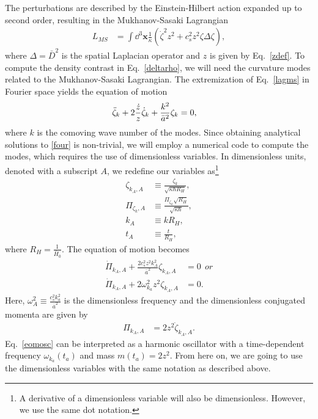 \documentclass[a4paper,11pt]{article}
\begin{document}
The perturbations are described by the Einstein-Hilbert action expanded up to second order, resulting in the Mukhanov-Sasaki Lagrangian
\begin{align}
	\label{lagms}
	L_{MS} & = \int \dd^3\textbf{x} \frac{1}{ \kappa} \left({\dot{\zeta}}^2 z^2 + c_s^2 z^2 \zeta\Delta \zeta\right)
	,\end{align}
where $\Delta = \bar{D}^2$ is the spatial Laplacian operator and $z$ is given by Eq.~\eqref{zdef}.
To compute the density contrast in Eq.~\eqref{deltarho}, we will need the curvature modes related to the Mukhanov-Sasaki Lagrangian. The extremization of Eq.~\eqref{lagms} in Fourier space yields the equation of motion
\begin{align}
	\label{four}
	\Ddot{\zeta}_{k}+ 2\frac{ \dot{z} }{ z } \dot{\zeta}_k + \frac{k^2}{\bar{a}^2} \zeta_k & =0
	,\end{align}
where $k$ is the comoving wave number of the modes. Since obtaining analytical solutions to \eqref{four} is non-trivial, we will employ a numerical code to compute the modes, which requires the use of dimensionless variables. In dimensionless units, denoted with a subscript $A$, we redefine our variables as\footnote{A derivative of a dimensionless variable will also be dimensionless. However, we use the same dot notation.}
\begin{align}
	\zeta_{k_A, A}   & \equiv \frac{\zeta_{k}}{\sqrt{ \kappa \hbar R_H}},           \\
	\Pi_{\zeta_k, A} & \equiv \frac{\Pi_{\zeta_k} \sqrt{R_H}}{\sqrt{\kappa \hbar}}, \\
	\label{kadm}
	k_A              & \equiv k R_H,                                                \\
	t_A              & \equiv \frac{t}{R_H}
	,\end{align}
where $R_H = \frac{1}{\bar{H}_0}$. The equation of motion becomes
\begin{align}
	\label{eomosc}
	\dot{\Pi}_{k_A, A}+  \frac{2 c^2_s z^2 k_A^2}{\bar{a}^2  } \zeta_{k_A, A} & =0 \nonumber~~ or \\
	\dot{\Pi}_{k_A, A}+  2 \omega_{k_a}^2 z^2  \zeta_{k_A, A}                 & =0
	.\end{align}
Here, $\omega_A^2 \equiv \frac{c_s^2 k_a^2}{\bar{a}^2}$ is the dimensionless frequency and the dimensionless conjugated momenta are given by
\begin{align}
	\Pi_{k_A, A} & = 2 z^2 \dot{\zeta}_{k_A, A}
	.\end{align}
Eq.~\eqref{eomosc} can be interpreted as a harmonic oscillator with a time-dependent frequency $\omega_{k_a}(t_a)$ and mass $m(t_a) = 2z^2$. From here on, we are going to use the dimensionless variables with the same notation as described above.
\end{document}
